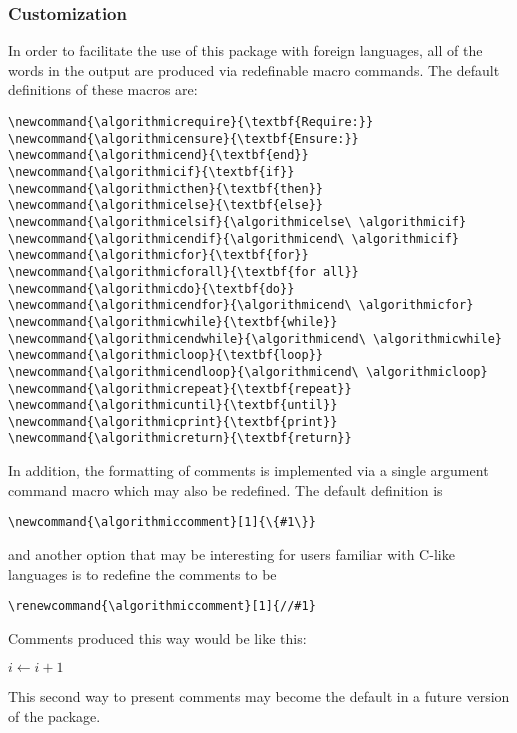 \documentclass{article}
\begin{document}
\subsubsection{Customization}

In order to facilitate the use of this package with foreign languages, all
of the words in the output are produced via redefinable macro commands.
The default definitions of these macros are:
\begin{verbatim}
\newcommand{\algorithmicrequire}{\textbf{Require:}}
\newcommand{\algorithmicensure}{\textbf{Ensure:}}
\newcommand{\algorithmicend}{\textbf{end}}
\newcommand{\algorithmicif}{\textbf{if}}
\newcommand{\algorithmicthen}{\textbf{then}}
\newcommand{\algorithmicelse}{\textbf{else}}
\newcommand{\algorithmicelsif}{\algorithmicelse\ \algorithmicif}
\newcommand{\algorithmicendif}{\algorithmicend\ \algorithmicif}
\newcommand{\algorithmicfor}{\textbf{for}}
\newcommand{\algorithmicforall}{\textbf{for all}}
\newcommand{\algorithmicdo}{\textbf{do}}
\newcommand{\algorithmicendfor}{\algorithmicend\ \algorithmicfor}
\newcommand{\algorithmicwhile}{\textbf{while}}
\newcommand{\algorithmicendwhile}{\algorithmicend\ \algorithmicwhile}
\newcommand{\algorithmicloop}{\textbf{loop}}
\newcommand{\algorithmicendloop}{\algorithmicend\ \algorithmicloop}
\newcommand{\algorithmicrepeat}{\textbf{repeat}}
\newcommand{\algorithmicuntil}{\textbf{until}}
\newcommand{\algorithmicprint}{\textbf{print}}
\newcommand{\algorithmicreturn}{\textbf{return}}
\end{verbatim}

In addition, the formatting of comments is implemented via a single
argument command macro which may also be redefined.
The default definition is
\begin{verbatim}
\newcommand{\algorithmiccomment}[1]{\{#1\}}
\end{verbatim}
and another option that may be interesting for users familiar with C-like
languages is to redefine the comments to be
\begin{verbatim}
\renewcommand{\algorithmiccomment}[1]{//#1}
\end{verbatim}

Comments produced this way would be like this:
\renewcommand{\algorithmiccomment}[1]{//#1}
\begin{algorithmic}
  \STATE $i \leftarrow i +1$ 
\end{algorithmic}
This second way to present comments may become the default in a future
version of the package.
\end{document}
